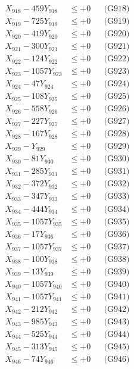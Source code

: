 \documentclass[a4paper,10pt]{article}
\begin{document}
{\begin{align}
X_{918} - 459Y_{918} &\leq +0 && \text{(G918)} \\
X_{919} - 725Y_{919} &\leq +0 && \text{(G919)} \\
X_{920} - 419Y_{920} &\leq +0 && \text{(G920)} \\
\allowbreak
X_{921} - 300Y_{921} &\leq +0 && \text{(G921)} \\
X_{922} - 124Y_{922} &\leq +0 && \text{(G922)} \\
X_{923} - 1057Y_{923} &\leq +0 && \text{(G923)} \\
X_{924} - 47Y_{924} &\leq +0 && \text{(G924)} \\
X_{925} - 108Y_{925} &\leq +0 && \text{(G925)} \\
X_{926} - 558Y_{926} &\leq +0 && \text{(G926)} \\
X_{927} - 227Y_{927} &\leq +0 && \text{(G927)} \\
X_{928} - 167Y_{928} &\leq +0 && \text{(G928)} \\
X_{929} - Y_{929} &\leq +0 && \text{(G929)} \\
X_{930} - 81Y_{930} &\leq +0 && \text{(G930)} \\
\allowbreak
X_{931} - 285Y_{931} &\leq +0 && \text{(G931)} \\
X_{932} - 372Y_{932} &\leq +0 && \text{(G932)} \\
X_{933} - 347Y_{933} &\leq +0 && \text{(G933)} \\
X_{934} - 444Y_{934} &\leq +0 && \text{(G934)} \\
X_{935} - 1057Y_{935} &\leq +0 && \text{(G935)} \\
X_{936} - 17Y_{936} &\leq +0 && \text{(G936)} \\
X_{937} - 1057Y_{937} &\leq +0 && \text{(G937)} \\
X_{938} - 100Y_{938} &\leq +0 && \text{(G938)} \\
X_{939} - 13Y_{939} &\leq +0 && \text{(G939)} \\
X_{940} - 1057Y_{940} &\leq +0 && \text{(G940)} \\
\allowbreak
X_{941} - 1057Y_{941} &\leq +0 && \text{(G941)} \\
X_{942} - 212Y_{942} &\leq +0 && \text{(G942)} \\
X_{943} - 985Y_{943} &\leq +0 && \text{(G943)} \\
X_{944} - 525Y_{944} &\leq +0 && \text{(G944)} \\
X_{945} - 313Y_{945} &\leq +0 && \text{(G945)} \\
X_{946} - 74Y_{946} &\leq +0 && \text{(G946)} \\

\end{align}}
\end{document}
